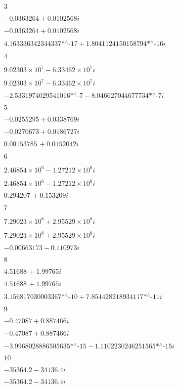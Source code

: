 \noindent\(3\)

\noindent\(-0.0363264+0.0102568 i\)

\noindent\(-0.0363264+0.0102568 i\)

\noindent\(\text{4.163336342344337$\grave{ }$*${}^{\wedge}$-17}+\text{1.8041124150158794$\grave{ }$*${}^{\wedge}$-16} i\)

\noindent\(4\)

\noindent\(9.02303\times 10^7-6.33462\times 10^7 i\)

\noindent\(9.02303\times 10^7-6.33462\times 10^7 i\)

\noindent\(-\text{2.5331974029541016$\grave{ }$*${}^{\wedge}$-7}-\text{8.046627044677734$\grave{ }$*${}^{\wedge}$-7} i\)

\noindent\(5\)

\noindent\(-0.0255295+0.0338769 i\)

\noindent\(-0.0270673+0.0186727 i\)

\noindent\(0.00153785\, +0.0152042 i\)

\noindent\(6\)

\noindent\(2.46854\times 10^6-1.27212\times 10^6 i\)

\noindent\(2.46854\times 10^6-1.27212\times 10^6 i\)

\noindent\(0.294207\, +0.153209 i\)

\noindent\(7\)

\noindent\(7.29023\times 10^8+2.95529\times 10^8 i\)

\noindent\(7.29023\times 10^8+2.95529\times 10^8 i\)

\noindent\(-0.00663173-0.110973 i\)

\noindent\(8\)

\noindent\(4.51688\, +1.99765 i\)

\noindent\(4.51688\, +1.99765 i\)

\noindent\(\text{3.156817030003367$\grave{ }$*${}^{\wedge}$-10}+\text{7.854428218934117$\grave{ }$*${}^{\wedge}$-11} i\)

\noindent\(9\)

\noindent\(-0.47087+0.887466 i\)

\noindent\(-0.47087+0.887466 i\)

\noindent\(-\text{3.9968028886505635$\grave{ }$*${}^{\wedge}$-15}-\text{1.1102230246251565$\grave{ }$*${}^{\wedge}$-15} i\)

\noindent\(10\)

\noindent\(-35364.2-34136.4 i\)

\noindent\(-35364.2-34136.4 i\)

